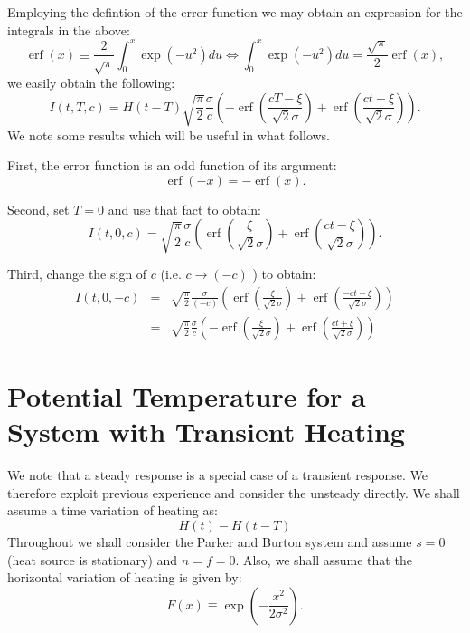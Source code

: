 \documentclass[12pt]{article}
\DeclareMathOperator\erf {erf}
\begin{document}
%
Employing the defintion of the error function we may obtain an expression for the integrals in the above:
%
\begin{equation}
\erf (x) \equiv  \frac{ 2 }{\sqrt{ \pi } } \int_0^x \exp \left(- u^2 \right) du \iff  \int_0^x \exp \left(- u^2 \right) du = \frac{\sqrt{\pi}}{2} \erf(x),
\end{equation}
%
we easily obtain the following:
%
\begin{equation}
I (t,T,c) = H(t-T) \sqrt{ \frac{\pi}{2} } \frac{ \sigma }{ c }\left( - \erf \left( \frac{cT-\xi}{\sqrt{2} \sigma} \right) +  \erf \left( \frac{ct-\xi}{\sqrt{2} \sigma} \right)    \right) .
\end{equation}
%
We note some results which will be useful in what follows. 

First, the error function is an odd function of its argument:
%
\begin{equation}
\erf(-x) = - \erf(x).
\end{equation}

Second, set $T=0$ and use that fact to obtain:
%
\begin{equation}
I (t,0,c) = \sqrt{ \frac{\pi}{2} } \frac{ \sigma }{ c } \left(  \erf \left( \frac{\xi}{\sqrt{2} \sigma} \right) +  \erf \left( \frac{ct-\xi}{\sqrt{2} \sigma} \right)    \right) .
\end{equation}
%

Third, change the sign of $c$ (i.e. $c \rightarrow (-c) $ ) to obtain:
%
\begin{eqnarray}
\label{equ_property1}
I (t,0,-c) & = & \sqrt{ \frac{\pi}{2} } \frac{ \sigma }{(- c) }\left(  \erf \left( \frac{\xi}{\sqrt{2} \sigma} \right) + \erf \left( \frac{- ct-\xi}{\sqrt{2} \sigma} \right)    \right)  \\ \nonumber
& = &  \sqrt{ \frac{\pi}{2} } \frac{ \sigma }{ c }\left( -  \erf \left( \frac{\xi}{\sqrt{2} \sigma} \right) + \erf \left( \frac{ct+\xi}{\sqrt{2} \sigma} \right)    \right)
\end{eqnarray}
%
\section{Potential Temperature for a System with Transient Heating}
\label{sec_bresponse}
%
%
%
We note that a steady response is a special case of a transient response. We therefore exploit previous experience and consider the unsteady directly.
We shall assume a time variation of heating as:
%
\begin{equation}
 H(t) - H(t-T) 
\end{equation}
%
Throughout we shall consider the Parker and Burton system and assume $s=0$ (heat source is stationary) and $n=f=0$.
Also, we shall assume that the horizontal variation of heating is given by:
%
\begin{equation}
F(x) \equiv \exp \left( - \frac{x^2}{2 \sigma^2 } \right).
\end{equation}
%
%
%
\end{document}
